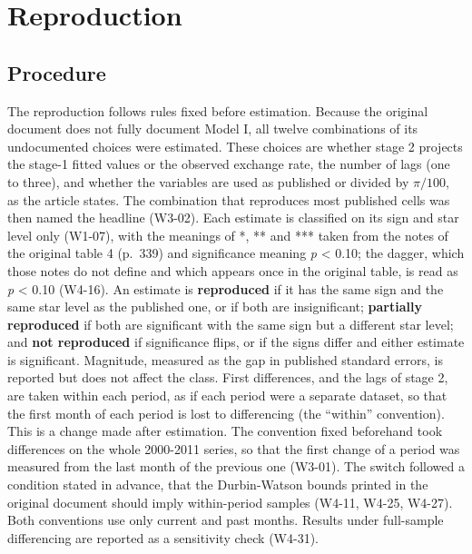 \documentclass[
  12pt,
  a4paper,
]{article}
\begin{document}
\renewcommand*{\arraystretch}{1}

\section{Reproduction}\label{sec-reproduction}

\subsection{Procedure}\label{procedure}

The reproduction follows rules fixed before estimation. Because the
original document does not fully document Model I, all twelve
combinations of its undocumented choices were estimated. These choices
are whether stage 2 projects the stage-1 fitted values or the observed
exchange rate, the number of lags (one to three), and whether the
variables are used as published or divided by \(\pi/100\), as the
article states. The combination that reproduces most published cells was
then named the headline (W3-02). Each estimate is classified on its sign
and star level only (W1-07), with the meanings of *, ** and *** taken
from the notes of the original table 4 (p.~339) and significance meaning
\emph{p} \textless{} 0.10; the dagger, which those notes do not define
and which appears once in the original table, is read as \emph{p}
\textless{} 0.10 (W4-16). An estimate is \textbf{reproduced} if it has
the same sign and the same star level as the published one, or if both
are insignificant; \textbf{partially reproduced} if both are significant
with the same sign but a different star level; and \textbf{not
reproduced} if significance flips, or if the signs differ and either
estimate is significant. Magnitude, measured as the gap in published
standard errors, is reported but does not affect the class. First
differences, and the lags of stage 2, are taken within each period, as
if each period were a separate dataset, so that the first month of each
period is lost to differencing (the ``within'' convention). This is a
change made after estimation. The convention fixed beforehand took
differences on the whole 2000-2011 series, so that the first change of a
period was measured from the last month of the previous one (W3-01). The
switch followed a condition stated in advance, that the Durbin-Watson
bounds printed in the original document should imply within-period
samples (W4-11, W4-25, W4-27). Both conventions use only current and
past months. Results under full-sample differencing are reported as a
sensitivity check (W4-31).
\end{document}
